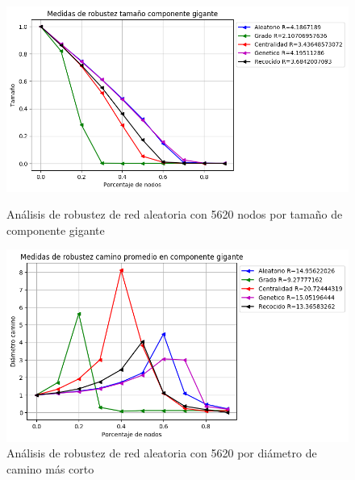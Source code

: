 \begin{figure}[!htb]
    \begin{minipage}{0.48\textwidth}
        \centering
        \includegraphics[scale=0.4]{CapituloAAnexos/imagenesAnexoC/Robustez/grafica_GC20180512_015627Random5620Nodes8804}
        \caption{Análisis de robustez de red aleatoria con 5620 nodos por tamaño de componente gigante}
    \end{minipage}\hfill
   \begin{minipage}{0.48\textwidth}
         \centering
       \includegraphics[scale=0.4]{CapituloAAnexos/imagenesAnexoC/Robustez/grafica_APL20180512_015627Random5620Nodes8804}
        \caption{Análisis de robustez de red aleatoria con 5620 por diámetro de camino más corto}
    \end{minipage}
\end{figure}



